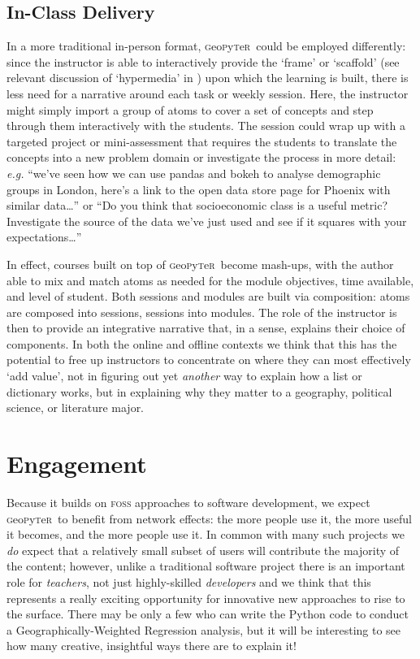 \documentclass[letter, 11pt]{article}
\newcommand{\gp}{\textsc{g}eo\textsc{p}y\textsc{t}e\textsc{r}~\/}
\begin{document}
\subsection{In-Class Delivery}\label{in-class-delivery}

In a more traditional in-person format, \gp could be employed differently: since
the instructor is able to interactively provide the `frame' or `scaffold' (see
relevant discussion of `hypermedia' in \citealp{Azevedo2008}) upon which the
learning is built, there is less need for a narrative around each task or weekly
session. Here, the instructor might simply import a group of atoms to cover a
set of concepts and step through them interactively with the students. The
session could wrap up with a targeted project or mini-assessment that requires
the students to translate the concepts into a new problem domain or investigate
the process in more detail: \emph{e.g.} ``we've seen how we can use pandas and
bokeh to analyse demographic groups in London, here's a link to the open data
store page for Phoenix with similar data\ldots{}'' or ``Do you think that
socioeconomic class is a useful metric? Investigate the source of the data we've
just used and see if it squares with your expectations\ldots{}''

In effect, courses built on top of \gp become mash-ups, with the author able to
mix and match atoms as needed for the module objectives, time available, and
level of student. Both sessions and modules are built via composition: atoms are
composed into sessions, sessions into modules. The role of the instructor is
then to provide an integrative narrative that, in a sense, explains their choice
of components. In both the online and offline contexts we think that this has
the potential to free up instructors to concentrate on where they can most
effectively `add value', not in figuring out yet \emph{another} way to explain
how a list or dictionary works, but in explaining why they matter to a
geography, political science, or literature major.

\section{Engagement}\label{engagement}

Because it builds on \textsc{foss} approaches to software development, we expect
\gp to benefit from network effects: the more people use it, the more useful it
becomes, and the more people use it. In common with many such projects we
\emph{do} expect that a relatively small subset of users will contribute the
majority of the content; however, unlike a traditional software project there is
an important role for \emph{teachers}, not just highly-skilled \emph{developers}
and we think that this represents a really exciting opportunity for innovative
new approaches to rise to the surface. There may be only a few who can write the
Python code to conduct a Geographically-Weighted Regression analysis, but it
will be interesting to see how many creative, insightful ways there are to
explain it!
\end{document}
